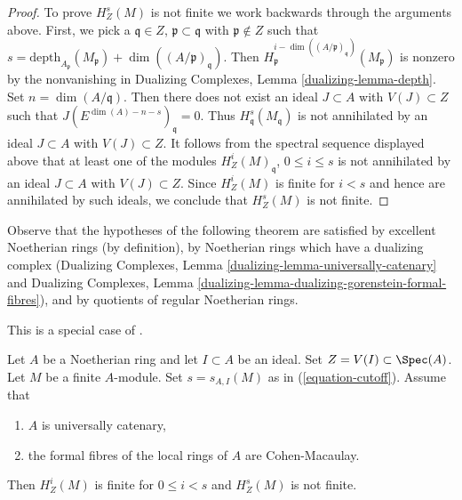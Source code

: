 \begin{proof}
\medskip\noindent
To prove $H^s_Z(M)$ is not finite we work
backwards through the arguments above. First, we pick a
$\mathfrak q \in Z$, $\mathfrak p \subset \mathfrak q$
with $\mathfrak p \not \in Z$ such that
$s = \text{depth}_{A_\mathfrak p}(M_\mathfrak p) +
\dim((A/\mathfrak p)_\mathfrak q)$. Then
$H^{i - \dim((A/\mathfrak p)_\mathfrak q)}_\mathfrak p(M_\mathfrak p)$
is nonzero by the nonvanishing in
Dualizing Complexes, Lemma \ref{dualizing-lemma-depth}.
Set $n = \dim(A/\mathfrak q)$. Then
there does not exist an ideal $J \subset A$ with $V(J) \subset Z$
such that $J(E^{\dim(A) - n - s})_\mathfrak q = 0$.
Thus $H^s_\mathfrak q(M_\mathfrak q)$ is not
annihilated by an ideal $J \subset A$ with $V(J) \subset Z$.
It follows from the spectral sequence displayed above
that at least one of the modules $H^i_Z(M)_\mathfrak q$,
$0 \leq i \leq s$ is not annihilated by an ideal $J \subset A$
with $V(J) \subset Z$. Since $H^i_Z(M)$ is finite for $i < s$
and hence are annihilated by such ideals,
we conclude that $H^s_Z(M)$ is not finite.
\end{proof}

\noindent
Observe that the hypotheses of the following theorem are satisfied
by excellent Noetherian rings (by definition),
by Noetherian rings which have a dualizing complex
(Dualizing Complexes, Lemma \ref{dualizing-lemma-universally-catenary} and
Dualizing Complexes, Lemma
\ref{dualizing-lemma-dualizing-gorenstein-formal-fibres}), and
by quotients of regular Noetherian rings.

\begin{theorem}
\label{theorem-finiteness}
\begin{reference}
This is a special case of \cite[Satz 2]{Faltings-finiteness}.
\end{reference}
Let $A$ be a Noetherian ring and let $I \subset A$ be an ideal.
Set $Z = V(I) \subset \Spec(A)$. Let $M$ be a finite $A$-module.
Set $s = s_{A, I}(M)$ as in (\ref{equation-cutoff}).
Assume that
\begin{enumerate}
\item $A$ is universally catenary,
\item the formal fibres of the local rings of $A$ are Cohen-Macaulay.
\end{enumerate}
Then $H^i_Z(M)$ is finite for $0 \leq i < s$ and
$H^s_Z(M)$ is not finite.
\end{theorem}

